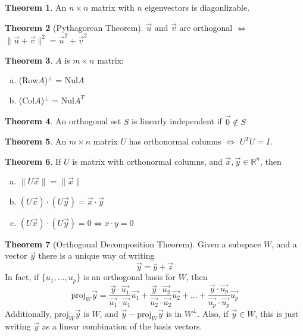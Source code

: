 \documentclass[a4paper,12pt]{article}
\theoremstyle{definition}
\newtheorem{theorem}{Theorem}
\theoremstyle{definition}
\newcommand{\finitevecs}[2]{#1_1,\ldots,#1_#2}
\newcommand{\finitevecsset}[2]{\{\finitevecs{#1}{#2}\}}
\newcommand{\finiteadd}[3]{#1 + #2 + \ldots + #3}
\newcommand{\dotprod}[2]{#1 \cdot #2}
\newcommand{\dotprodvecs}[2]{\dotprod{\vec{#1}}{\vec{#2}}}
\newcommand{\norm}[1]{\lVert #1 \rVert}
\newcommand{\normvec}[1]{\norm{\vec{#1}}}
\newcommand{\orthoproj}[2]{\frac{\dotprodvecs{#1}{#2}}{\dotprodvecs{#2}{#2}}\vec{#2}}
\begin{document}
	\begin{theorem}
		\label{thm:eigenvec-diagonlization-thm}
		An $n \times n$ matrix with $n$ eigenvectors is diagonlizable.
	\end{theorem}
	
	\begin{theorem}[Pythagorean Theorem]
		\label{thm:pythagorean-thm}
		$\vec{u}$ and $\vec{v}$ are orthogonal $\Leftrightarrow$ $\norm{\vec{u} + \vec{v}}^2 = \vec{u}^2 + \vec{v}^2$
	\end{theorem}
	
	\begin{theorem}
		\label{thm:row-col-spc-perp-thm}
		$A$ is $m \times n$ matrix:
		\begin{enumerate}[a.]
			\item (Row$A$)$^\perp$ = Nul$A$
			
			\item (Col$A$)$^\perp$ = Nul$A^T$
		\end{enumerate}
	\end{theorem}
	
	\begin{theorem}
		\label{thm:lin-indep-ortho-set-thm}
		An orthogonal set $S$ is linearly independent if $\vec{0} \notin S$ 
	\end{theorem}
	
	\begin{theorem}
		\label{thm: u-t-u-eq-i-thm}
		An $m \times n$ matrix $U$ has orthonormal columns $\Leftrightarrow$ $U^TU = I$.
	\end{theorem}
	
	\begin{theorem}
		\label{thm:orthonorm-cols-props-thm}
		If $U$ is matrix with orthonormal columns, and $\vec{x}, \vec{y} \in \mathbb{R}^n$, then
		\begin{enumerate}[a.]
			\item $\norm{U\vec{x}} = \normvec{x}$
			
			\item $\dotprod{(U\vec{x})}{(U\vec{y})} = \dotprodvecs{x}{y}$
			
			\item $\dotprod{(U\vec{x})}{(U\vec{y})} = 0 \Leftrightarrow \dotprod{x}{y} = 0$
		\end{enumerate}
	\end{theorem}
	
	\begin{theorem}[Orthogonal Decomposition Theorem]
		\label{thm:orthogonal-decomp-thm}
		Given a subspace $W$, and a vector $\vec{y}$ there is a unique way of writing
		\begin{equation*}
			\vec{y} = \hat{y} + \vec{z}
		\end{equation*}
		In fact, if $\finitevecsset{u}{p}$ is an orthogonal basis for $W$, then \begin{equation*}
			\text{proj}_W\vec{y} = \finiteadd{\orthoproj{y}{u_1}}{\orthoproj{y}{u_2}}{\orthoproj{y}{u_p}}
		\end{equation*}
		Additionally, $\text{proj}_W\vec{y}$ is $W$, and $\vec{y} - \text{proj}_W\vec{y}$ is in $W^\perp$. Also, if $\vec{y} \in W$, this is just writing $\vec{y}$ as a linear combination of the basis vectors.
	\end{theorem}
	
\end{document}
